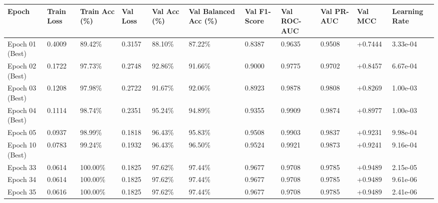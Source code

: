 \begin{tabular}{lllllllllll}
\toprule
Epoch & Train Loss & Train Acc (\%) & Val Loss & Val Acc (\%) & Val Balanced Acc (\%) & Val F1-Score & Val ROC-AUC & Val PR-AUC & Val MCC & Learning Rate \\
\midrule
Epoch 01 (Best) & 0.4009 & 89.42\% & 0.3157 & 88.10\% & 87.22\% & 0.8387 & 0.9635 & 0.9508 & +0.7444 & 3.33e-04 \\
Epoch 02 (Best) & 0.1722 & 97.73\% & 0.2748 & 92.86\% & 91.66\% & 0.9000 & 0.9775 & 0.9702 & +0.8457 & 6.67e-04 \\
Epoch 03 (Best) & 0.1208 & 97.98\% & 0.2722 & 91.67\% & 92.06\% & 0.8923 & 0.9878 & 0.9808 & +0.8269 & 1.00e-03 \\
Epoch 04 (Best) & 0.1114 & 98.74\% & 0.2351 & 95.24\% & 94.89\% & 0.9355 & 0.9909 & 0.9874 & +0.8977 & 1.00e-03 \\
Epoch 05 & 0.0937 & 98.99\% & 0.1818 & 96.43\% & 95.83\% & 0.9508 & 0.9903 & 0.9837 & +0.9231 & 9.98e-04 \\
Epoch 10 (Best) & 0.0783 & 99.24\% & 0.1932 & 96.43\% & 96.50\% & 0.9524 & 0.9921 & 0.9873 & +0.9241 & 9.16e-04 \\
Epoch 33 & 0.0614 & 100.00\% & 0.1825 & 97.62\% & 97.44\% & 0.9677 & 0.9708 & 0.9785 & +0.9489 & 2.15e-05 \\
Epoch 34 & 0.0614 & 100.00\% & 0.1825 & 97.62\% & 97.44\% & 0.9677 & 0.9708 & 0.9785 & +0.9489 & 9.61e-06 \\
Epoch 35 & 0.0616 & 100.00\% & 0.1825 & 97.62\% & 97.44\% & 0.9677 & 0.9708 & 0.9785 & +0.9489 & 2.41e-06 \\
\bottomrule
\end{tabular}
